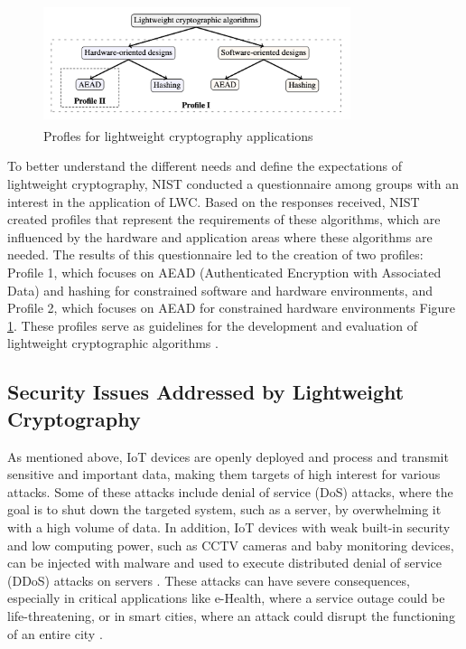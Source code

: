 \documentclass[a4paper,11pt, twoside]{article}
\begin{document}
\begin{figure}[h]
    \centering
    \includegraphics[width=9.0cm, height=3.5cm]{media/profiles.png}
    \caption{Profles for lightweight cryptography applications}
    \label{fig:profiles}
\end{figure}

To better understand the different needs and define the expectations of lightweight cryptography, NIST conducted a questionnaire among groups with an interest in the application of LWC. Based on the responses received, NIST created profiles that represent the requirements of these algorithms, which are influenced by the hardware and application areas where these algorithms are needed. The results of this questionnaire led to the creation of two profiles: Profile 1, which focuses on AEAD (Authenticated Encryption with Associated Data) and hashing for constrained software and hardware environments, and Profile 2, which focuses on AEAD for constrained hardware environments Figure \ref{fig:profiles}. These profiles serve as guidelines for the development and evaluation of lightweight cryptographic algorithms \cite{mckay2016report}.

\subsection{Security Issues Addressed by Lightweight Cryptography}   %
As mentioned above, IoT devices are openly deployed and process and transmit sensitive and important data, making them targets of high interest for various attacks. Some of these attacks include denial of service (DoS) attacks, where the goal is to shut down the targeted system, such as a server, by overwhelming it with a high volume of data. In addition, IoT devices with weak built-in security and low computing power, such as CCTV cameras and baby monitoring devices, can be injected with malware and used to execute distributed denial of service (DDoS) attacks on servers \cite{mckay2016report} \cite{salim2020distributed}. These attacks can have severe consequences, especially in critical applications like e-Health, where a service outage could be life-threatening, or in smart cities, where an attack could disrupt the functioning of an entire city \cite{dhanda2020lightweight}.
\end{document}
